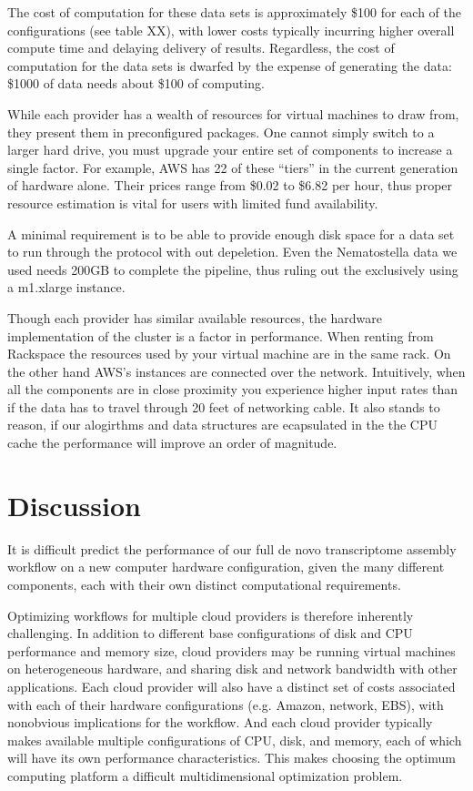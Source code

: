 The cost of computation for these data sets is approximately \$100 for
each of the configurations (see table XX), with lower costs typically
incurring higher overall compute time and delaying delivery of results.
Regardless, the cost of computation for the data sets is dwarfed by
the expense of generating the data: \$1000 of data needs about \$100
of computing.

While each provider has a wealth of resources for virtual machines to draw 
from, they present them in preconfigured packages. One cannot simply switch to
a larger hard drive, you must upgrade your entire set of components to 
increase a single factor. For example, AWS has 22 of these ``tiers'' in the 
current generation of hardware alone. Their prices range from \$0.02 to \$6.82
per hour, thus proper resource estimation is vital for users with limited fund
availability. 

A minimal requirement is to be able to provide enough disk space for a data set
to run through the protocol with out depeletion. Even the Nematostella data 
we used needs 200GB to complete the pipeline, thus ruling out the exclusively
using a m1.xlarge instance.

Though each provider has similar available resources, the hardware
implementation of the cluster is a factor in performance. When renting from
Rackspace the resources used by your virtual machine are in the same rack. On
the other hand AWS’s instances are connected over the network. Intuitively,
when all the components are in close proximity you experience higher input
rates than if the data has to travel through 20 feet of networking cable. It 
also stands to reason, if our alogirthms and data structures are ecapsulated 
in the the CPU cache the performance will improve an order of magnitude.

\section*{Discussion}

It is difficult predict the performance of our full de novo
transcriptome assembly workflow on a new computer hardware
configuration, given the many different components, each with
their own distinct computational requirements.  

Optimizing workflows for multiple cloud providers is therefore
inherently challenging.  In addition to different base configurations
of disk and CPU performance and memory size, cloud providers may be
running virtual machines on heterogeneous hardware, and sharing disk
and network bandwidth with other applications.  Each cloud provider
will also have a distinct set of costs associated with each of their
hardware configurations (e.g. Amazon, network, EBS), with nonobvious
implications for the workflow.  And each cloud provider typically
makes available multiple configurations of CPU, disk, and memory, each
of which will have its own performance characteristics.  This makes
choosing the optimum computing platform a difficult multidimensional
optimization problem.

